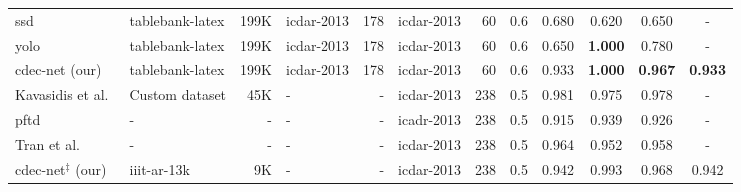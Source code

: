 \documentclass[a4paper,conference]{IEEEtran}
\begin{document}
\begin{table*}
\begin{center}
\begin{tabular}{|l| l | r|l |r|l|r| c| c c c c|}
{\sc ssd}~\cite{casado2019benefits} &{\sc t}able{\sc b}ank-{\sc l}a{\sc t}e{\sc x} &199K &{\sc icdar}-2013 &178 &{\sc icdar}-2013 &60 &0.6 &0.680 &0.620 &0.650 &- \\ 
{\sc yolo}~\cite{casado2019benefits}  &{\sc t}able{\sc b}ank-{\sc l}a{\sc t}e{\sc x} &199K &{\sc icdar}-2013 &178 &{\sc icdar}-2013 &60 &0.6 &0.650 &\textbf{1.000} &0.780 &- \\ 
{\sc cd}e{\sc c-n}et (our) &{\sc t}able{\sc b}ank-{\sc l}a{\sc t}e{\sc x} &199K &{\sc icdar}-2013 &178 &{\sc icdar}-2013 &60 &0.6 &0.933 &\textbf{1.000} &\textbf{0.967} &\textbf{0.933} \\ \hhline{|=|=|=|=|=|=|=|=|====|}
Kavasidis et al.~\cite{kavasidis2018saliencybased} &Custom dataset &45K &- &- &{\sc icdar}-2013 &238 &0.5 &0.981& 0.975& 0.978 &- \\ 
{\sc pftd}~\cite{melinda2019parameter} &- &- &- &- &{\sc icadr}-2013 &238 &0.5 &0.915& 0.939& 0.926& - \\  
Tran et al.~\cite{tran2015table} &- &- &- &- &{\sc icdar}-2013 &238 &0.5 &0.964 &0.952 &0.958 &- \\ 
 \hhline{|=|=|=|=|=|=|=|=|====|}
{\sc cd}e{\sc c-n}et$^{\ddagger}$ (our) &{\sc iiit-ar-13k} &9K &- &- &{\sc icdar}-2013 &238 &0.5 &0.942 &0.993 &0.968 &0.942 \\ \hline
\end{tabular}
\end{center}
\caption{Illustrates comparison between the proposed {\sc cd}e{\sc c-n}et and state-of-the-art techniques on {\sc icdar-2013} dataset. {\sc \textbf{a:}} indicates anchor optimization, {\sc \textbf{pg:}} indicates post-processing technique, {\sc \textbf{sf:}} indicates semantic features, {\sc \textbf{d1:}} indicates Marmot+{\sc unlv}+{\sc icdar-2017}, \textbf{*:} indicates the authors reported 0.996 in table however in discussion they mentioned 0.994. {\sc cd}\textbf{e}{\sc c-n}et$^{\ddagger}$\textbf{:} indicates a single  model which is trained with {\sc iiit-ar-13k} dataset. \label{table_icdar_2013}}
\end{table*}
\end{document}
